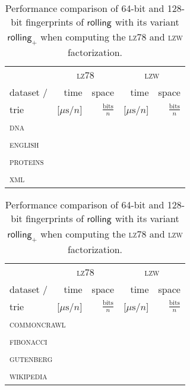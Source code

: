 \documentclass[a4paper]{article}
\newcommand*{\namelabel}[1]{{\textsc{#1}}}
\newcommand*{\LZW}{{\namelabel{lzw}}}
\newcommand*{\LZEight}{{\namelabel{lz78}}}
\newcommand*{\instancename}[1]{\ensuremath{\mathsf{#1}}} %
\newcommand{\iRolling}[1]{\ensuremath{\instancename{rolling_{#1}}}}
\begin{document}
\begin{table}[t!]
		\begin{tabular}{l*{4}{r}}
			\toprule
			&	\multicolumn{2}{c}{\LZEight{}} & \multicolumn{2}{c}{\LZW{}}
			\\ \cmidrule(lr){2-3} \cmidrule(lr){4-5}
	dataset / & time & space & time & space \\
	trie			& [$\mu \text{s}/n$] & $\frac{\text{bits}}{n}$ & [$\mu \text{s}/n$] & $\frac{\text{bits}}{n}$ \\
\multicolumn{4}{l}{\textsc{dna}}
\\\midrule
%

%
\multicolumn{4}{l}{\textsc{english}} 
\\\midrule
%

%
\multicolumn{4}{l}{\textsc{proteins}} 
\\\midrule
%

%
\multicolumn{4}{l}{\textsc{xml}} 
\\\midrule
%

 			 \bottomrule
   \end{tabular}
		\begin{tabular}{l*{4}{r}}
			\toprule
			&	\multicolumn{2}{c}{\LZEight{}} & \multicolumn{2}{c}{\LZW{}}
			\\ \cmidrule(lr){2-3} \cmidrule(lr){4-5}
	dataset / & time & space & time & space \\
	trie			& [$\mu \text{s}/n$] & $\frac{\text{bits}}{n}$ & [$\mu \text{s}/n$] & $\frac{\text{bits}}{n}$ \\
%
\multicolumn{4}{l}{\textsc{commoncrawl}} 
\\\midrule
%

%
\multicolumn{4}{l}{\textsc{fibonacci}} 
\\\midrule
%

%
\multicolumn{4}{l}{\textsc{gutenberg}} 
\\\midrule
%

%
\multicolumn{4}{l}{\textsc{wikipedia}} 
\\\midrule
%

 			 \bottomrule
   \end{tabular}
   \caption{Performance comparison of 64-bit and 128-bit fingerprints of \iRolling{} with its variant \iRolling{+} when computing the \LZEight{} and \LZW{} factorization.}
\label{tableLargeBitsRolling}
   \end{table}
\end{document}
